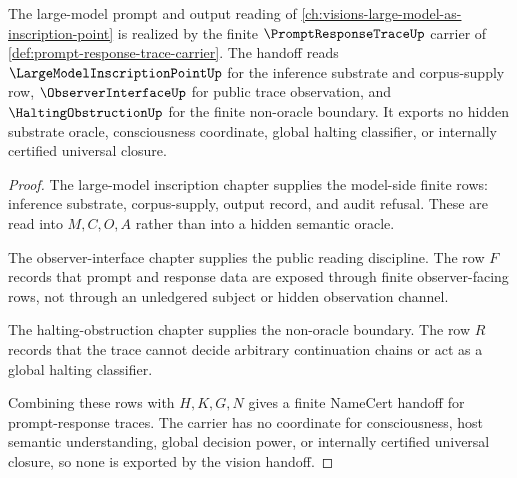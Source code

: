 \begin{theorem}
\label{thm:prompt-response-trace-vision-handoff}
The large-model prompt and output reading of \autoref{ch:visions-large-model-as-inscription-point} is realized by the finite $\PromptResponseTraceUp$ carrier of \autoref{def:prompt-response-trace-carrier}. The handoff reads $\LargeModelInscriptionPointUp$ for the inference substrate and corpus-supply row, $\ObserverInterfaceUp$ for public trace observation, and $\HaltingObstructionUp$ for the finite non-oracle boundary. It exports no hidden substrate oracle, consciousness coordinate, global halting classifier, or internally certified universal closure.
\end{theorem}
\begin{proof}
The large-model inscription chapter supplies the model-side finite rows: inference substrate, corpus-supply, output record, and audit refusal. These are read into $M,C,O,A$ rather than into a hidden semantic oracle.

The observer-interface chapter supplies the public reading discipline. The row $F$ records that prompt and response data are exposed through finite observer-facing rows, not through an unledgered subject or hidden observation channel.

The halting-obstruction chapter supplies the non-oracle boundary. The row $R$ records that the trace cannot decide arbitrary continuation chains or act as a global halting classifier.

Combining these rows with $H,K,G,N$ gives a finite NameCert handoff for prompt-response traces. The carrier has no coordinate for consciousness, host semantic understanding, global decision power, or internally certified universal closure, so none is exported by the vision handoff.
\end{proof}

